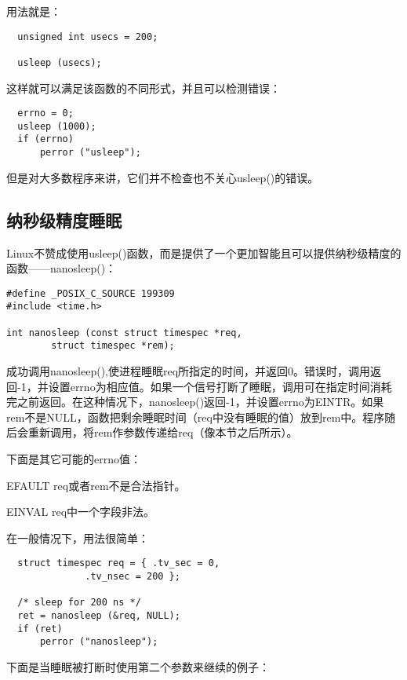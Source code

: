 用法就是： 

\begin{lstlisting}
  unsigned int usecs = 200;

  usleep (usecs);
\end{lstlisting}

这样就可以满足该函数的不同形式，并且可以检测错误： 

\begin{lstlisting}
  errno = 0;
  usleep (1000);
  if (errno)
      perror ("usleep");
\end{lstlisting}

但是对大多数程序来讲，它们并不检查也不关心usleep()的错误。

\subsection{纳秒级精度睡眠}

Linux不赞成使用usleep()函数，而是提供了一个更加智能且可以提供纳秒级精度的函数——nanosleep()： 

\begin{lstlisting}
#define _POSIX_C_SOURCE 199309
#include <time.h>

int nanosleep (const struct timespec *req,
		struct timespec *rem);
\end{lstlisting}

成功调用nanosleep(),使进程睡眠req所指定的时间，并返回0。错误时，调用返回-1，并设置errno为相应值。如果一个信号打断了睡眠，调用可在指定时间消耗完之前返回。在这种情况下，nanosleep()返回-1，并设置errno为EINTR。如果rem不是NULL，函数把剩余睡眠时间（req中没有睡眠的值）放到rem中。程序随后会重新调用，将rem作参数传递给req（像本节之后所示）。 

下面是其它可能的errno值：

\begin{eqlist*}
\item [EFAULT]
req或者rem不是合法指针。 
\item [EINVAL]
req中一个字段非法。
\end{eqlist*}

在一般情况下，用法很简单： 

\begin{lstlisting}
  struct timespec req = { .tv_sec = 0,
			  .tv_nsec = 200 };

  /* sleep for 200 ns */
  ret = nanosleep (&req, NULL);
  if (ret)
      perror ("nanosleep");
\end{lstlisting}

下面是当睡眠被打断时使用第二个参数来继续的例子： 

